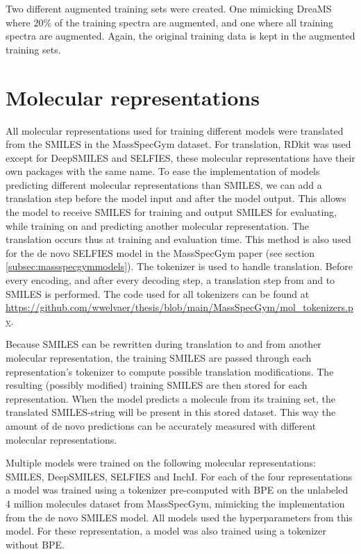 Two different augmented training sets were created.
One mimicking DreaMS where $20\%$ of the training spectra are augmented, and one where all training spectra are augmented.
Again, the original training data is kept in the augmented training sets.

\section{Molecular representations}
\label{sec:representations}

All molecular representations used for training different models were translated from the SMILES in the MassSpecGym dataset.
For translation, RDkit was used except for DeepSMILES and SELFIES, these molecular representations have their own packages with the same name.
To ease the implementation of models predicting different molecular representations than SMILES,
we can add a translation step before the model input and after the model output.
This allows the model to receive SMILES for training and output SMILES for evaluating,
while training on and predicting another molecular representation.
The translation occurs thus at training and evaluation time.
This method is also used for the de novo SELFIES model in the MassSpecGym paper (see section \ref{subsec:massspecgymmodels}).
The tokenizer is used to handle translation. Before every encoding, and after every decoding step, a translation step from and to SMILES is performed.
The code used for all tokenizers can be found at \url{https://github.com/wwelvaer/thesis/blob/main/MassSpecGym/mol_tokenizers.py}.

Because SMILES can be rewritten during translation to and from another molecular representation,
the training SMILES are passed through each representation's tokenizer to compute possible translation modifications.
The resulting (possibly modified) training SMILES are then stored for each representation.
When the model predicts a molecule from its training set, the translated SMILES-string will be present in this stored dataset.
This way the amount of de novo predictions can be accurately measured with different molecular representations.

Multiple models were trained on the following molecular representations: SMILES, DeepSMILES, SELFIES and InchI.
For each of the four representations a model was trained using a tokenizer pre-computed with \ac{BPE} on the unlabeled 4 million molecules dataset from MassSpecGym,
mimicking the implementation from the de novo SMILES model. All models used the hyperparameters from this model.
For these representation, a model was also trained using a tokenizer without \ac{BPE}.

